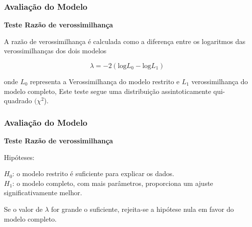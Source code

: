 \documentclass{beamer}
\begin{document}
	
\begin{comment}
		\begin{frame}
			
			\frametitle{Estimação dos Parâmetros }
			
			
			\begin{block}{Estimação Bayesiana}
				
				A abordagem bayesiana é usada para estimar os parâmetros da TRI com base na distribuição \textit{a priori} dos parâmetros. Ela incorpora informações prévias sobre os parâmetros e atualiza essas informações com base nas respostas dos participantes.\\ 
				
			\end{block}
			
		\end{frame}
	\end{comment}
	
\begin{frame}
		
		\frametitle{Avaliação do Modelo}
		
	   \begin{center}
	   	\textbf{Teste Razão de verossimilhança} 
	   	\hfill
	   \end{center}
		
		A razão de verossimilhança é calculada como a diferença entre os logaritmos das verossimilhanças dos dois modelos
		
		\[
		\lambda = -2 (\text{log} L_0 - \text{log} L_1)
		\]
		
		onde $L_0$ representa a Verossimilhança do modelo restrito e
		$L_1$ verossimilhança do modelo completo, Este teste segue uma distribuição assintoticamente qui-quadrado $(\chi^2$).
		
	\end{frame}	

\begin{frame}
	
	\frametitle{Avaliação do Modelo}

	\begin{center}
		\textbf{Teste Razão de verossimilhança} 
		\hfill
	\end{center}
	
	Hipóteses:\\
	\hfill 

	$H_0$: o modelo restrito é suficiente para explicar os dados.\\
	$H_1$: o modelo completo, com mais parâmetros, proporciona um ajuste significativamente melhor.\\
	\hfill
	
	Se o valor de $\lambda$ for grande o suficiente, rejeita-se a hipótese nula em favor do modelo completo. 
	
\end{frame}
	
\end{document}
